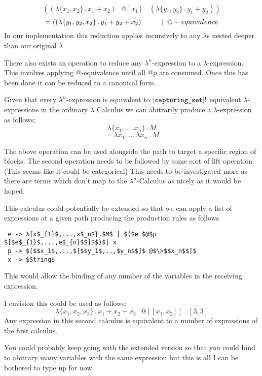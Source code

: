 \documentclass{article}
\begin{document}
\begin{equation}
    ((\lambda\{x_1, x_2\}\,.\, x_1 + x_2) \>\>\>@[x_1]\>\>\>\>(\lambda\{y_1, y_2\}\,.\, y_1 + y_2)) 
\end{equation}
\begin{equation}
   = ((\lambda\{y_1, y_2, x_2\}\,.\, y_1 + y_2 + x_2) \hspace{10mm}|\hspace{2mm}@-equivalence
\end{equation}
\noindent In our implementation this reduction applies recursively to any $\lambda$s nested deeper than our original $\lambda$

\noindent There also exists an operation to reduce any $\lambda^n$-expression to a $\lambda$-expression. This involves applying @-equivalence until all @$p$ are consumed. Once this has been done it can be reduced to a canonical form.

\noindent Given that every $\lambda^{n}$-expression is equivalent to $|\verb|capturing_set||!$ equivalent $\lambda$-expressions in the ordinary $\lambda$ Calculus we can abitrarily produce a $\lambda$-expression as follows: 
\begin{equation}
    \lambda\{x_1,..., x_n\}\,.\,M
\end{equation}
\begin{equation}
   = \lambda x_1 .\>...\>\lambda x_n\>.\,M  
\end{equation}
\par
\noindent The above operation can be used alongside the path to target a specific region of blocks. The second operation needs to be followed by some sort of lift operation. (This seems like it could be categorical) This needs to be investigated more as there are terms which don't map to the $\lambda^n$-Calculus as nicely as it would be hoped.


\noindent This calculus could potentially be extended so that we can apply a list of expressions at a given path producing the production rules as follows
\begin{lstlisting}
 e -> λ{x$_{1}$,...,x$_n$}.$M$ | $($e $@$p $[$e$_{1}$,...,e$_{n}$$]$$)$| x
 p -> $[$$x_1$,...,$[$$y_1$,..,$y_n$$]$ @$\>$$x_n$$]$
 x -> $String$
\end{lstlisting}
\vspace{-5mm}
\noindent This would allow the binding of any number of the variables in the receiving expression. 

\noindent I envision this could be used as follows:
\begin{equation}
    \lambda\{x_1,x_2,x_3\}\,.\,x_1 + x_2 + x_3 \>\>\>@[[x_1, x_2]]\>\>\>\>[3,3]
\end{equation}
\noindent Any expression in this second calculus is equivalent to a number of expressions of the first calculus.

\noindent You could probably keep going with the extended version so that you could bind to abitrary many variables with the same expression but this is all I can be bothered to type up for now.
\end{document}
